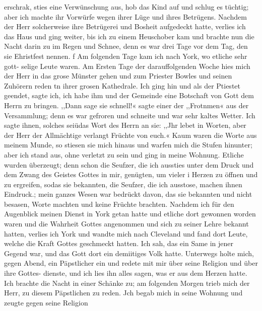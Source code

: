 erschrak, sties eine Verwünschung aus, hob das Kind auf und
schlug es tüchtig; aber ich machte ihr Vorwürfe wegen ihrer
Lüge und ihres Betrügens. Nachdem der Herr solcherweise ihre
Betrügerei und Bosheit aufgedeckt hatte, verlies ich das Haus
und ging weiter, bis ich zu einem Heuschober kam und brachte
nun die Nacht darin zu im Regen und Schnee, denn es war
drei Tage vor dem Tag, den sie Ehristfest nennen.
f Am folgenden Tage kam ich nach York, wo etliche sehr gott-
selige Leute waren. Am Ersten Tage der darauffolgenden
Woche hies mich der Herr in das grose Münster gehen und zum
Priester Bowles und seinen Zuhörern reden tn ihrer grosen
Kathedrale. Ich ging hin und als der Ptiestet geendet, sagte ich,
ich habe ihm und der Gemeinde eine Botschaft von Gott dem
Herrn zu bringen. ,,Dann sage sie schnell!« sagte einer der
,,Frotnmen« aus der Versammlung; denn es war gefroren und
schneite und war sehr kaltes Wetter. Ich sagte ihnen, solches
seiüdas Wort des Herrn an sie: ,,Jhr lebet in Worten, aber der
Herr der Allmächtige verlangt Früchte von euch.« Kaum waren
die Worte aus meinem Munde, so stiesen sie mich hinaus und
warfen mich die Stufen hinunter; aber ich stand aus, ohne verletzt
zu sein und ging in meine Wohnung. Etliche wurden überzeugt;
denn schon die Seufzer, die ich aussties unter dem Druck und
dem Zwang des Geistes Gottes in mir, genügten, um vieler
i Herzen zu öffnen und zu ergreifen, sodas sie bekannten, die Seufzer,
die ich ausstose, machen ihnen Eindruck.; mein ganzes Wesen
war bedrückt davon, das sie bekannten und nicht besasen, Worte
machten und keine Früchte brachten.
Nachdem ich für den Augenblick meinen Dienst in York getan
hatte und etliche dort gewonnen worden waren und die Wahrheit
Gottes angenommen und sich zu seiner Lehre bekannt hatten,
verlies ich York und wandte mich nach Cleveland und fand dort
Leute, welche die Kraft Gottes geschmeckt hatten. Ich sah, das
ein Same in jener Gegend war, und das Gott dort ein demiitiges
Volk hatte. Unterwegs holte mich, gegen Abend, ein Päpstlicher
ein und redete mit mir über seine Religion und über ihre Gottes-
dienste, und ich lies ihn alles sagen, was er aus dem Herzen
hatte. Ich brachte die Nacht in einer Schänke zu; am folgenden
Morgen trieb mich der Herr, zu diesem Päpstlichen zu reden. Jch
begab mich in seine Wohnung und zeugte gegen seine Religion


